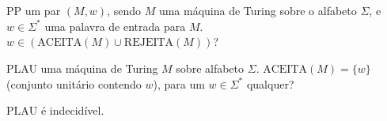 \documentclass{article}
\begin{document}

\newpage

\section{}

\vspace{6pt}

\problemBox
{PP}
{um par $(M, w)$, sendo $M$ uma máquina de Turing sobre o
alfabeto $\Sigma$, e $w \in \Sigma^{*}$ uma palavra de entrada para $M$.}
{$w \in (\mathrm{ACEITA}(M) \cup \mathrm{REJEITA}(M))$?}

\vspace{8pt}

\problemBox
{PLAU}
{uma máquina de Turing $M$ sobre alfabeto $\Sigma$.}
{$\mathrm{ACEITA}(M) = \{w\}$ (conjunto unitário contendo $w$), para
um $w \in \Sigma^{*}$ qualquer?}

\vspace{10pt}

\begin{theorem}
    $\mathrm{PLAU}$ é indecidível.
\end{theorem}
\end{document}
